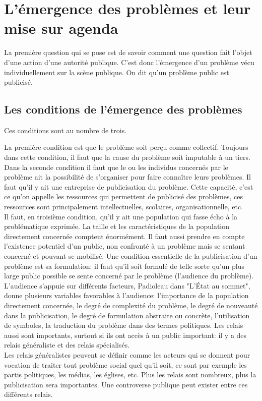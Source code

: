 \documentclass[10pt, a4paper, openany]{book}
\begin{document}
\chapter{L'émergence des problèmes et leur mise sur agenda}

La première question qui se pose est de savoir comment une question fait l'objet d'une action d'une autorité publique. C'est donc l'émergence d'un problème vécu individuellement sur la scène publique. On dit qu'un problème public est publicisé. 

\section{Les conditions de l'émergence des problèmes}

Ces conditions sont au nombre de trois. 


La première condition est que le problème soit perçu comme collectif. Toujours dans cette condition, il faut que la cause du problème soit imputable à un tiers. \\
Dans la seconde condition il faut que le ou les individus concernés par le problème ait la possibilité de s'organiser pour faire connaître leurs problèmes. Il faut qu'il y ait une entreprise de publicisation du problème. Cette capacité, c'est ce qu'on appelle les ressources qui permettent de publicisé des problèmes, ces ressources sont principalement intellectuelles, scolaires, organisationnelle, etc. \\
Il faut, en troisième condition, qu'il y ait une population qui fasse écho à la problématique exprimée. La taille et les caractéristiques de la population directement concernée comptent énormément. Il faut aussi prendre en compte l'existence potentiel d'un public, non confronté à un problème mais se sentant concerné et pouvant se mobilisé. Une condition essentielle de la publicisation d'un problème est sa formulation: il faut qu'il soit formulé de telle sorte qu'un plus large public possible se sente concerné par le problème (l'audience du problème). L'audience s'appuie sur différents facteurs, Padioleau dans "L'État au sommet", donne plusieurs variables favorables à l'audience: l'importance de la population directement concernée, le degré de complexité du problème, le degré de nouveauté dans la publicisation, le degré de formulation abstraite ou concrète, l'utilisation de symboles, la traduction du problème dans des termes politiques. Les relais aussi sont importants, surtout si ils ont accès à un public important: il y a des relais généraliste et des relais spécialisés. \\
Les relais généralistes peuvent se définir comme les acteurs qui se donnent pour vocation de traiter tout problème social quel qu'il soit, ce sont par exemple les partis politiques, les médias, les églises, etc. Plus les relais sont nombreux, plus la publicisation sera importantes. Une controverse publique peut exister entre ces différents relais. \\
\end{document}
